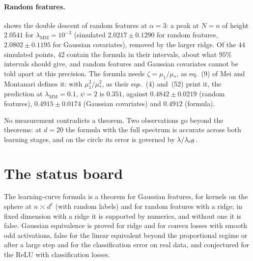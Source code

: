 \begin{refsection}
\paragraph{Random features.}  shows the double descent of random features at $\alpha=3$: a peak at $N=n$ of height $2.0541$ for $\lambda_{\mathrm{MM}}=10^{-3}$ (simulated $2.0217\pm0.1290$ for random features, $2.0802\pm0.1195$ for Gaussian covariates), removed by the larger ridge. Of the $44$ simulated points, $42$ contain the formula in their intervals, about what $95\%$ intervals should give, and random features and Gaussian covariates cannot be told apart at this precision. The formula needs $\zeta=\mu_1/\mu_*$, as eq.~(9) of Mei and Montanari defines it: with $\mu_1^2/\mu_*^2$, as their eqs.~(4) and~(52) print it, the prediction at $\lambda_{\mathrm{MM}}=0.1$, $\psi=2$ is $0.351$, against $0.4842\pm0.0219$ (random features), $0.4915\pm0.0174$ (Gaussian covariates) and $0.4912$ (formula).

No measurement contradicts a theorem. Two observations go beyond the theorems: at $d=20$ the formula with the full spectrum is accurate across both learning stages, and on the circle its error is governed by $\lambda/\lambda_{\mathrm{eff}}$.

\section{The status board}\label{sec:kernels:board}

The learning-curve formula is a theorem for Gaussian features, for kernels on the sphere at $n\asymp d^\ell$ (with random labels) and for random features with a ridge; in fixed dimension with a ridge it is supported by numerics, and without one it is false. Gaussian equivalence is proved for ridge and for convex losses with smooth odd activations, false for the linear equivalent beyond the proportional regime or after a large step and for the classification error on real data, and conjectured for the ReLU with classification losses.


\end{refsection}

